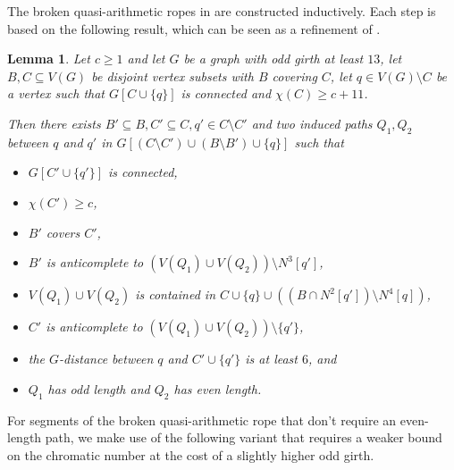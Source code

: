 \documentclass{article}
\newtheorem{lemma}[theorem]{Lemma}
\begin{document}
The broken quasi-arithmetic ropes in  are constructed inductively.
Each step is based on the following result, which can be seen as a refinement of \cite[Lem. 4.4]{chudnovsky2024colouringtperfectgraphs}.

\begin{lemma}\label{lemma:contruction_two_paths_optimal}
    Let $c \geq 1$ and let $G$ be a graph with odd girth at least $13$, let $B, C \subseteq V(G)$ be disjoint vertex subsets with $B$ covering $C$, let $q \in V(G) \setminus C$ be a vertex such that $G[C \cup \{q\}]$ is connected and $\chi(C)\geq c+11$.

    Then there exists $B' \subseteq B, C' \subseteq C, q' \in C \setminus C'$ and two induced paths $Q_1, Q_2$ between $q$ and $q'$ in $G[(C \setminus C') \cup (B \setminus B') \cup \{q\}]$ such that 

    \begin{itemize}
        \item $G[C' \cup \{q'\}]$ is connected,
        \item $\chi(C') \geq c$, 
        \item $B'$ covers $C'$,
        \item $B'$ is anticomplete to $(V(Q_1) \cup V(Q_2)) \setminus N^3[q']$,
        \item $V(Q_1) \cup V(Q_2)$ is contained in $C \cup \{q\} \cup ((B \cap N^2[q']) \setminus N^4[q])$,
        \item $C'$ is anticomplete to $(V(Q_1) \cup V(Q_2)) \setminus \{q'\}$,
        \item the $G$-distance between $q$ and $C' \cup \{q'\}$ is at least $6$, and
        \item $Q_1$ has odd length and $Q_2$ has even length.
    \end{itemize}
\end{lemma}

For segments of the broken quasi-arithmetic rope that don't require an even-length path, we make use of the following variant that requires a weaker bound on the chromatic number at the cost of a slightly higher odd girth.
\end{document}
